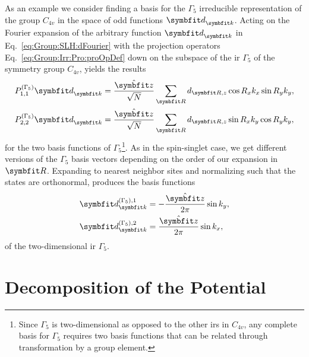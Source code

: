 As an example we consider finding a basis for the $\Gamma_5$ irreducible representation of the group $C_{4v}$ in the space of odd functions $\v{d}_\v{k}$.
Acting on the Fourier expansion of the arbitrary function $\v{d}_\v{k}$ in Eq.~\eqref{eq:Group:SLH:dFourier} with the projection operators Eq.~\eqref{eq:Group:Irr:Pro:proOpDef}
down on the subspace of the \ac{ir} $\Gamma_5$ of the symmetry group $C_{4v}$, yields the results
\begin{subequations}
    \label{eq:Group:SLH:odd:projections}
    \begin{align}
        \label{eq:Group:SLH:odd:projections:1}
        P_{1,1}^{(\Gamma_5)}\v{d}_\v{k} &= \frac{\hat{\v{z}}}{\sqrt{N}}\sum_\v{R}d_{\v{R},z}\cos R_xk_x \sin R_yk_y,\\
        \label{eq:Group:SLH:odd:projections:2}
        P_{2,2}^{(\Gamma_5)}\v{d}_\v{k} &= \frac{\hat{\v{z}}}{\sqrt{N}}\sum_\v{R}d_{\v{R},z}\sin R_xk_y\cos R_yk_y,
    \end{align}
\end{subequations}
for the two basis functions of $\Gamma_5$\footnote{Since $\Gamma_5$ is two-dimensional as opposed to the other \ac{ir}s in $C_{4v}$, any complete basis for $\Gamma_5$ requires two basis
functions that can be related through transformation by a group element.}. 
As in the spin-singlet case, we get different versions of the $\Gamma_5$ basis vectors depending on the order of our expansion in $\v{R}$.
Expanding to nearest neighbor sites and normalizing such that the states are orthonormal, produces the basis functions
\begin{subequations}
    \label{eq:Group:SLH:odd:G5basis}
    \begin{align}
        \label{eq:Group:SLH:odd:G5basis:1}
        \v{d}^{(\Gamma_5),1}_\v{k} &= -\frac{\hat{\v{z}}}{2\pi}\sin k_y,\\
        \label{eq:Group:SLH:odd:G5basis:2}
        \v{d}^{(\Gamma_5),2}_\v{k} &= \frac{\hat{\v{z}}}{2\pi}\sin k_x,
    \end{align}
\end{subequations}
of the two-dimensional \ac{ir} $\Gamma_5$.

\section{Decomposition of the Potential}
\label{sec:Group:Potential}

